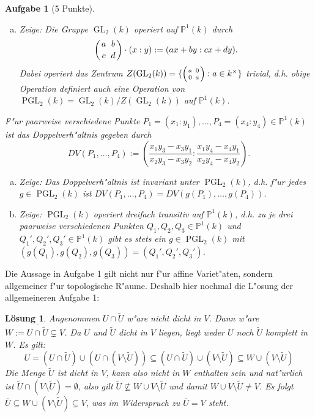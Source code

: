 \documentclass[a4paper, 12pt, numbers=noendperiod, chapterprefix=true, headsepline]{scrbook}
\theoremstyle{break}
\newtheorem{Aufg}{Aufgabe}
\newtheorem{Loes}{L\"osung}
\theoremstyle{nonumberbreak}
\theoremstyle{nonumberplain}
\DeclareMathOperator{\GL}{GL}
\DeclareMathOperator{\PGL}{PGL} %
\newcommand{\IP}{\mathbb{P}}%
\begin{document}
\begin{Aufg}[5 Punkte]
\begin{enumerate}[a)]
\item \emph{Zeige}: Die Gruppe $\GL_2(k)$ operiert auf $\IP^1(k)$ durch
	\[
		\left( {a \atop c} \ {b \atop d} \right) \cdot (x:y) := (ax+by:cx+dy) .
	\]
Dabei operiert das Zentrum $Z(\GL_2(k)) = \{ \Big( {a \atop 0} \, {0 \atop a} \Big) : a \in k^\times \}$ trivial, d.h. obige Operation definiert auch eine Operation von $\PGL_2(k) = \GL_2(k) / Z(\GL_2(k))$ auf $\IP^1(k)$.
\end{enumerate}

F"ur paarweise verschiedene Punkte $P_1 = (x_1:y_1), \dots, P_4=(x_4:y_4) \in \IP^1(k)$ ist das Doppelverh"altnis gegeben durch
	\[
		DV(P_1, \ldots, P_4) := \left( \frac{x_1y_3-x_3y_1}{x_2y_3-x_3y_2} : \frac{x_1y_4-x_4y_1}{x_2y_4-x_4y_2} \right).
	\]
\begin{enumerate}[a)]
	\item[b)] \emph{Zeige}: Das Doppelverh"altnis ist invariant unter $\PGL_2(k)$, d.h. f"ur jedes $g \in \PGL_2(k)$ ist $DV(P_1, \ldots, P_4) = DV(g(P_1), \ldots, g(P_4))$.
	\item[c)] \emph{Zeige}: $\PGL_2(k)$ operiert dreifach transitiv auf $\IP^1(k)$, d.h. zu je drei paarweise verschiedenen Punkten $Q_1, Q_2, Q_3 \in \IP^1(k)$ und $Q_1', Q_2', Q_3' \in \IP^1(k)$ gibt es stets ein $g \in \PGL_2(k)$ mit $(g(Q_1), g(Q_2), g(Q_3)) = (Q_1', Q_2', Q_3')$.
\end{enumerate}\end{Aufg}

Die Aussage in Aufgabe 1 gilt nicht nur f"ur affine Variet"aten, sondern allgemeiner f"ur topologische R"aume. Deshalb hier nochmal die L"osung der allgemeineren Aufgabe 1:

\begin{Loes}
Angenommen $U \cap \tilde{U}$ w"are nicht dicht in $V$. Dann w"are $W := \overline{U \cap \tilde{U}} \subsetneq V$. Da $U$ und $\tilde{U}$ dicht in $V$ liegen, liegt weder $U$ noch $\tilde{U}$ komplett in $W$. Es gilt:
 \[U  = (U \cap \tilde{U}) \cup  (U \cap (V \setminus \tilde{U})) \subseteq (U \cap \tilde{U}) \cup (V \setminus \tilde{U}) \subseteq W \cup (V \setminus \tilde{U})\]
Die Menge $\tilde{U}$ ist dicht in $V$, kann also nicht in $W$ enthalten sein und nat"urlich ist $\tilde{U} \cap (V \setminus \tilde{U}) = \emptyset$, also gilt $\tilde{U} \nsubseteq W \cup V \setminus \tilde{U}$ und damit $W \cup V \setminus \tilde{U} \neq V$. Es folgt $\overline{U} \subseteq W \cup (V \setminus \tilde{U}) \subsetneq V$, was im Widerspruch zu $\overline{U} = V$ steht.
\end{Loes}
\end{document}
